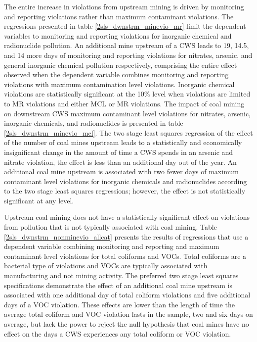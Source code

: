 \documentclass{article}
\begin{document}
The entire increase in violations from upstream mining is driven by monitoring and reporting violations rather than maximum contaminant violations. The regressions presented in table \ref{2sls_dwnstrm_minevio_mr} limit the dependent variables to monitoring and reporting violations for inorganic chemical and radionuclide pollution. An additional mine upstream of a CWS leads to 19, 14.5, and 14 more days of monitoring and reporting violations for nitrates, arsenic, and general inorganic chemical pollution respectively, comprising the entire effect observed when the dependent variable combines monitoring and reporting violations with maximum contamination level violations. Inorganic chemical violations are statistically significant at the 10\% level when violations are limited to MR violations and either MCL or MR violations. The impact of coal mining on downstream CWS maximum contaminant level violations for nitrates, arsenic, inorganic chemicals, and radionuclides is presented in table \ref{2sls_dwnstrm_minevio_mcl}. The two stage least squares regression of the effect of the number of coal mines upstream leads to a statistically and economically insignificant change in the amount of time a CWS spends in an arsenic and nitrate violation, the effect is less than an additional day out of the year. An additional coal mine upstream is associated with two fewer days of maximum contaminant level violations for inorganic chemicals and radionuclides according to the two stage least squares regressions; however, the effect is not statistically significant at any level.

Upstream coal mining does not have a statistically significant effect on violations from pollution that is not typically associated with coal mining. Table \ref{2sls_dwnstrm_nonminevio_allcat} presents the results of regressions that use a dependent variable combining monitoring and reporting and maximum contaminant level violations for total coliforms and VOCs. Total coliforms are a bacterial type of violations and VOCs are typically associated with manufacturing and not mining activity. The preferred two stage least squares specifications demonstrate the effect of an additional coal mine upstream is associated with one additional day of total coliform violations and five additional days of a VOC violation. These effects are lower than the length of time the average total coliform and VOC violation lasts in the sample, two and six days on average, but lack the power to reject the null hypothesis that coal mines have no effect on the days a CWS experiences any total coliform or VOC violation. 
\end{document}
